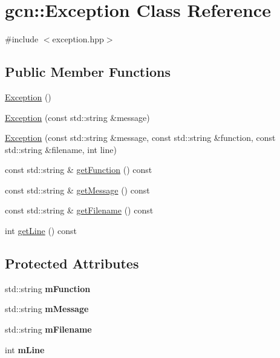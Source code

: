 \hypertarget{classgcn_1_1Exception}{}\section{gcn\+:\+:Exception Class Reference}
\label{classgcn_1_1Exception}


{\ttfamily \#include $<$exception.\+hpp$>$}

\subsection*{Public Member Functions}
\begin{DoxyCompactItemize}
\item 
\hyperlink{classgcn_1_1Exception_ac6c412a3c4d4f1727b8c847b5dd63bf2}{Exception} ()
\item 
\hyperlink{classgcn_1_1Exception_a4f475350e88e0538f51ec91fb357c729}{Exception} (const std\+::string \&message)
\item 
\hyperlink{classgcn_1_1Exception_ac3bae5d8753050442871681b59b63773}{Exception} (const std\+::string \&message, const std\+::string \&function, const std\+::string \&filename, int line)
\item 
const std\+::string \& \hyperlink{classgcn_1_1Exception_ac409ab0094bd0e9e341f01a532e2fe96}{get\+Function} () const 
\item 
const std\+::string \& \hyperlink{classgcn_1_1Exception_a7c1ca793f383c6dd92eb7fb1694260de}{get\+Message} () const 
\item 
const std\+::string \& \hyperlink{classgcn_1_1Exception_a7918049e3407ace4a59361c1a29b81ac}{get\+Filename} () const 
\item 
int \hyperlink{classgcn_1_1Exception_a93a217b190df8d70405e9feb09c18c00}{get\+Line} () const 
\end{DoxyCompactItemize}
\subsection*{Protected Attributes}
\begin{DoxyCompactItemize}
\item 
std\+::string {\bfseries m\+Function}\hypertarget{classgcn_1_1Exception_ac4cecdef532e30f82d9095789732cfaa}{}\label{classgcn_1_1Exception_ac4cecdef532e30f82d9095789732cfaa}

\item 
std\+::string {\bfseries m\+Message}\hypertarget{classgcn_1_1Exception_a1337ec9291e5587eb2a544212aaa1355}{}\label{classgcn_1_1Exception_a1337ec9291e5587eb2a544212aaa1355}

\item 
std\+::string {\bfseries m\+Filename}\hypertarget{classgcn_1_1Exception_a698a27a1b9d2fba424141d228f5a97a0}{}\label{classgcn_1_1Exception_a698a27a1b9d2fba424141d228f5a97a0}

\item 
int {\bfseries m\+Line}\hypertarget{classgcn_1_1Exception_aaac5868e205d6e89d1546e18ac244daf}{}\label{classgcn_1_1Exception_aaac5868e205d6e89d1546e18ac244daf}

\end{DoxyCompactItemize}



